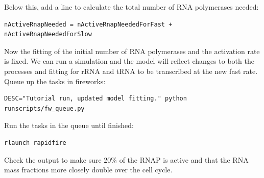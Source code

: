 \documentclass[12pt]{article}
\begin{document}
Below this, add a line to calculate the total number of RNA polymerases needed:

\begin{lstlisting}
nActiveRnapNeeded = nActiveRnapNeededForFast + nActiveRnapNeededForSlow
\end{lstlisting}

Now the fitting of the initial number of RNA polymerases and the activation rate is fixed. We can run a simulation and the model will reflect changes to both the processes and fitting for rRNA and tRNA to be transcribed at the new fast rate. Queue up the tasks in fireworks:

\lstset{language=bash}
\begin{lstlisting}
DESC="Tutorial run, updated model fitting." python runscripts/fw_queue.py
\end{lstlisting}

Run the tasks in the queue until finished:

\begin{lstlisting}
rlaunch rapidfire
\end{lstlisting}

Check the output to make sure 20\% of the RNAP is active and that the RNA mass fractions more closely double over the cell cycle.
\end{document}
